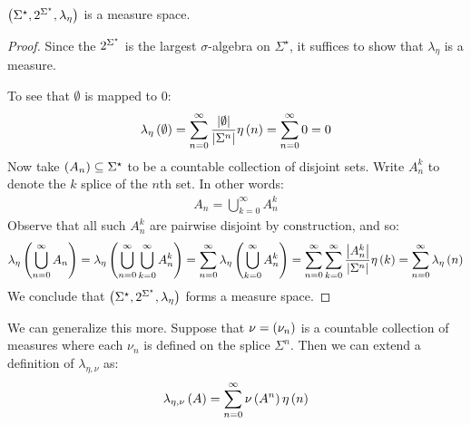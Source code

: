 \begin{theorem}
  \(\left(\Sigma^\star, 2^{\Sigma^\star}, \lambda_{\eta}\right)\)
  is a measure space.
\end{theorem}
\begin{proof}
  Since the \(2^{\Sigma^\star}\) is the largest \(\sigma\)-algebra
  on \(\Sigma^\star\), it suffices to show that \(\lambda_{\eta}\) is
  a measure.

  To see that \(\emptyset\) is mapped to \(0\):
  \begin{align*}
    \lambda_{\eta}\left(\emptyset\right)
      = \sum_{n = 0}^{\infty} \frac{\left\lvert\emptyset\right\rvert}{\left\lvert\Sigma^n\right\rvert} \eta\left(n\right)
      = \sum_{n = 0}^{\infty} 0
      = 0
  \end{align*}
  Now take \(\left(A_n\right) \subseteq \Sigma^\star\) to be a countable
  collection of disjoint sets.
  Write \(A_n ^k\) to denote the \(k\) splice of the \(n\)th set.
  In other words: \begin{align*}
    A_n = \bigcup_{k = 0}^{\infty} A_{n} ^k
  \end{align*}
  Observe that all such \(A_{n}^k\) are pairwise disjoint by construction,
  and so:
  \begin{align*}
    \lambda_{\eta} \left(\bigcup_{n = 0}^{\infty} A_n\right)
      = \lambda_{\eta} \left(\bigcup_{n = 0}^{\infty} \bigcup_{k = 0}^{\infty} A_n ^k\right)
      = \sum_{n = 0}^{\infty} \lambda_{\eta} \left(\bigcup_{k = 0}^{\infty} A_n ^k\right)
      = \sum_{n = 0}^{\infty} \sum_{k = 0}^{\infty} \frac{\left\lvert A_n ^k\right\rvert}{\left\lvert\Sigma^n\right\rvert} \eta\left(k\right)
      = \sum_{n = 0}^{\infty} \lambda_{\eta} \left(n\right)
  \end{align*}
  We conclude that \(\left(\Sigma^\star, 2^{\Sigma^\star}, \lambda_{\eta}\right)\)
  forms a measure space.

\end{proof}
We can generalize this more.
Suppose that \(\nu = \left(\nu_n\right)\)
is a countable collection of measures where
each \(\nu_n\) is defined on the splice \(\Sigma^n\).
Then we can extend a definition of \(\lambda_{\eta, \nu}\) as:
\begin{align*}
  \lambda_{\eta, \nu} \left(A\right)
    = \sum_{n = 0}^{\infty} \nu\left(A^n\right) \eta\left(n\right)
\end{align*}

